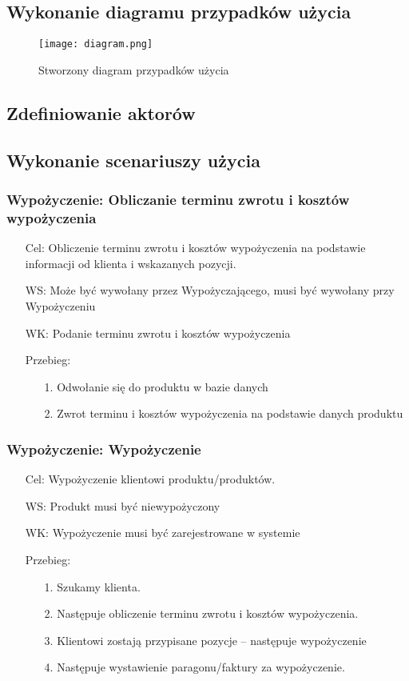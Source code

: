 \documentclass{article}
\begin{document}
	\subsection{Wykonanie diagramu przypadków użycia}
	\begin{figure}[!ht]
	\centering
	\texttt{[image: diagram.png]}
	\caption{Stworzony diagram przypadków użycia}
	\label{fig:obrazek 1}
	\end{figure}
	\subsection{Zdefiniowanie aktorów}


\subsection{Wykonanie scenariuszy użycia}	
\subsubsection{Wypożyczenie: Obliczanie terminu zwrotu i kosztów wypożyczenia}
\begin{enumerate}
	\item [Cel:] Obliczenie terminu zwrotu i kosztów wypożyczenia na podstawie informacji od klienta i wskazanych pozycji.
	\item [WS:] Może być wywołany przez Wypożyczającego, musi być wywołany przy Wypożyczeniu
	\item [WK:] Podanie terminu zwrotu i kosztów wypożyczenia
	\item [Przebieg:]
	\begin{enumerate}
	\item [1.]Odwołanie się do produktu w bazie danych
	\item [2.]Zwrot terminu i kosztów wypożyczenia na podstawie danych produktu
	\end{enumerate}
\end{enumerate}

\subsubsection{Wypożyczenie: Wypożyczenie}
\begin{enumerate}
	\item[Cel:] Wypożyczenie klientowi produktu/produktów. 
	\item[WS:] Produkt musi być niewypożyczony 
	\item[WK:] Wypożyczenie musi być zarejestrowane w systemie
	\item[Przebieg:]
	\begin{enumerate}
		\item [1.]Szukamy klienta.
		\item [2.]Następuje obliczenie terminu zwrotu i kosztów wypożyczenia.
		\item [3.]Klientowi zostają przypisane pozycje – następuje wypożyczenie
		\item [4.]Następuje wystawienie paragonu/faktury za wypożyczenie.
	\end{enumerate}
\end{enumerate}
\end{document}
